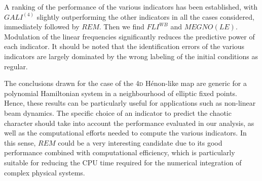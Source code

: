 A ranking of the performance of the various indicators has been established, with $GALI^{(4)}$ slightly outperforming the other indicators in all the cases considered, immediately followed by $REM$. Then we find $FLI^{{WB}}$ and $MEGNO(LE)$. Modulation of the linear frequencies significantly reduces the predictive power of each indicator. It should be noted that the identification errors of the various indicators are largely dominated by the wrong labeling of the initial conditions as regular. 

The conclusions drawn for the case of the 4\textsc{d} H\'enon-like map are generic for a polynomial Hamiltonian system in a neighbourhood of elliptic fixed points. Hence, these results can be particularly useful for applications such as non-linear beam dynamics. The specific choice of an indicator to predict the chaotic character should take into account the performance evaluated in our analysis, as well as the computational efforts needed to compute the various indicators. In this sense, $REM$ could be a very interesting candidate due to its good performance combined with computational efficiency, which is particularly suitable for reducing the CPU time required for the numerical integration of complex physical systems.
%
